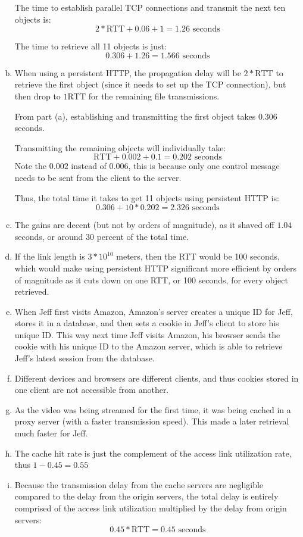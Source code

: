 \documentclass[11pt]{article}
\begin{document}
\begin{enumerate}[(a)]
      The time to establish parallel TCP connections and transmit the next ten objects
      is:
      \[ 2 * \text{RTT} + 0.06 + 1 = 1.26 \text{ seconds} \]

      The time to retrieve all 11 objects is just:
      \[ 0.306 + 1.26 = \boxed{1.566 \text{ seconds}} \]
    \item
      When using a persistent HTTP, the propagation delay will be $2 * \text{RTT}$
      to retrieve the first object (since it needs to set up the TCP connection),
      but then drop to $1 \text{RTT}$ for the remaining file transmissions.

      From part (a), establishing and transmitting the first object takes
      $0.306$ seconds.

      Transmitting the remaining objects will individually take:
      \[ \text{RTT} + 0.002 + 0.1 = 0.202 \text{ seconds} \]
      Note the $0.002$ instead of $0.006$, this is because only one control message
      needs to be sent from the client to the server.

      Thus, the total time it takes to get 11 objects using persistent HTTP is:
      \[ 0.306 + 10 * 0.202 = \boxed{2.326 \text{ seconds}} \]
    \item
      The gains are decent (but not by orders of magnitude), as it shaved off $1.04$
      seconds, or around 30 percent of the total time.
    \item
      If the link length is $3 * 10^{10}$ meters, then the RTT would be 100 seconds,
      which would make using persistent HTTP significant more efficient by orders of
      magnitude as it cuts down on one RTT, or 100 seconds, for every object retrieved.
    \item
      When Jeff first visits Amazon, Amazon's server creates a unique ID for Jeff,
      stores it in a database, and then sets a cookie in Jeff's client to store
      his unique ID. This way next time Jeff visits Amazon, his browser sends the
      cookie with his unique ID to the Amazon server, which is able to retrieve
      Jeff's latest session from the database.
    \item
      Different devices and browsers are different clients, and thus cookies stored in one
      client are not accessible from another.
    \item
      As the video was being streamed for the first time, it was being cached in a
      proxy server (with a faster transmission speed). This made a later retrieval
      much faster for Jeff.
    \item
      The cache hit rate is just the complement of the access link utilization
      rate, thus $1 - 0.45 = \boxed{0.55}$
    \item
      Because the transmission delay from the cache servers are negligible compared
      to the delay from the origin servers, the total delay is entirely comprised
      of the access link utilization multiplied by the delay from origin servers:
      \[ 0.45 * \text{RTT} = \boxed{0.45 \text{ seconds}} \]
  \end{enumerate}
\end{document}
